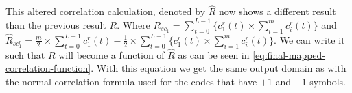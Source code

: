 
















This altered correlation calculation, denoted by $\hat{R}$ now shows a different result than the previous result $R$.
Where $R_{sc_{1}} = \displaystyle\sum_{t = 0} ^ {L - 1} \Bigg\{ c^r_1(t) \times  \displaystyle\sum_{i = 1} ^ {m} c^r_i(t) \Bigg\} $ and $\hat{R}_{sc^r_{1}} = \frac{m}{2} \times \displaystyle\sum_{t = 0} ^ {L - 1} c^r_1(t) - \frac{1}{2} \times \displaystyle\sum_{t = 0} ^ {L - 1}  \Bigg\{ c^r_1(t) \times \displaystyle\sum_{i = 1} ^ {m} c^r_i(t) \Bigg\}$.
We can write it such that $R$ will become a function of $\hat{R}$ as can be seen in \autoref{eq:final-mapped-correlation-function}.
With this equation we get the same output domain as with the normal correlation formula used for the codes that have $+1$ and $-1$ symbols.



